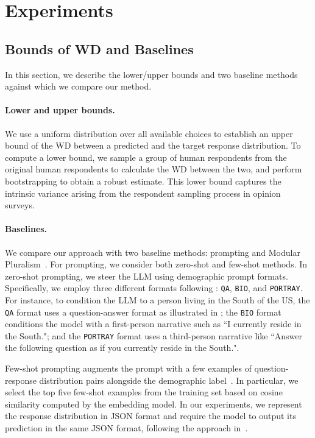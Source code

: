 \section{Experiments}
\label{section_experiments}


\subsection{Bounds of WD and Baselines}
\label{section_experiments_baseline}
In this section, we describe the lower/upper bounds and two baseline methods against which we compare our method.

\paragraph{Lower and upper bounds.} We use a uniform distribution over all available choices to establish an upper bound of the WD between a predicted and the target response distribution.
To compute a lower bound, we sample a group of human respondents from the original human respondents to calculate the WD between the two, and perform bootstrapping to obtain a robust estimate.
This lower bound captures the intrinsic variance arising from the respondent sampling process in opinion surveys.

\paragraph{Baselines.} We compare our approach with two baseline methods: prompting and Modular Pluralism~\cite{feng-etal-2024-modular}. 
For prompting, we consider both zero-shot and few-shot methods. In zero-shot prompting, we steer the LLM using demographic prompt formats. 
Specifically, we employ three different formats following \citet{santurkar2023whose}: \texttt{QA}, \texttt{BIO}, and \texttt{PORTRAY}. 
For instance, to condition the LLM to a person living in the South of the US, the \texttt{QA} format uses a question-answer format as illustrated in ; 
the \texttt{BIO} format conditions the model with a first-person narrative such as ``I currently reside in the South."; 
and the \texttt{PORTRAY} format uses a third-person narrative like ``Answer the following question as if you currently reside in the South.".

Few-shot prompting augments the prompt with a few examples of question-response distribution pairs alongside the demographic label~\cite{hwang2023aligning}. 
In particular, we select the top five few-shot examples from the \OURDATA training set based on cosine similarity computed by the embedding model. 
In our experiments, we represent the response distribution in JSON format and require the model to output its prediction in the same JSON format, following the approach in~\citet{meister2024benchmarking}.

